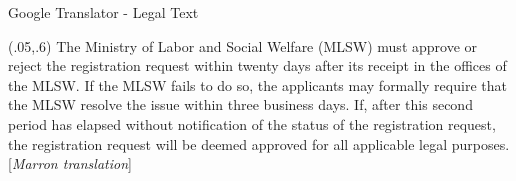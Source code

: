 \documentclass{beamer}
\begin{document}
\begin{frame} {Google Translator - Legal Text}
 
 \begin{textblock}{1}(.05,.6)
  \footnotesize {The Ministry of Labor and Social Welfare (MLSW) must approve or reject the registration request within twenty days after its receipt in the offices of the MLSW. If the MLSW fails to do so, the applicants may formally require that the MLSW resolve the issue within three business days. If, after this second period has elapsed without notification of the status of the registration request, the registration request will be deemed approved for all applicable legal purposes. [\textit{Marron translation}]}
\end{textblock}
 
\end{frame}
\end{document}
